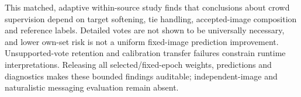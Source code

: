 This matched, adaptive within-source study finds that conclusions about crowd supervision depend on target softening, tie handling, accepted-image composition and reference labels. Detailed votes are not shown to be universally necessary, and lower own-set risk is not a uniform fixed-image prediction improvement. Unsupported-vote retention and calibration transfer failures constrain runtime interpretations. Releasing all selected/fixed-epoch weights, predictions and diagnostics makes these bounded findings auditable; independent-image and naturalistic messaging evaluation remain absent.